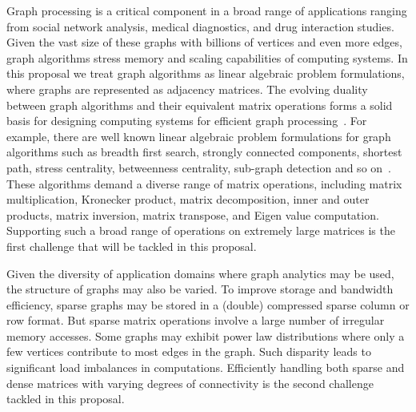 \noindent
Graph processing is a critical component in a broad range of applications ranging from social network analysis, medical diagnostics, and drug interaction studies.  
Given the vast size of these graphs with billions of vertices and even more edges, graph algorithms stress memory and scaling capabilities of computing systems. 
In this proposal we treat graph algorithms as linear algebraic problem formulations, where graphs are represented as adjacency matrices.  
The evolving duality between graph algorithms and their equivalent matrix operations forms a solid basis for 
designing computing systems %
for efficient graph processing~\cite{graph:primitives}.
For example, there are well known linear algebraic problem formulations for graph algorithms such as breadth first search, strongly connected components, shortest path, stress centrality, betweenness centrality, sub-graph detection and so on~\cite{kepner2011graph}.  
These algorithms demand a diverse range of matrix operations, including matrix multiplication, Kronecker product,  matrix decomposition, inner and outer products, matrix inversion, matrix transpose, and Eigen value computation.  
Supporting such a broad range of operations on extremely large matrices is the first challenge that will be tackled in this proposal. 


Given the diversity of application domains where graph analytics may be used, the structure of graphs may also be varied. 
To improve storage and bandwidth efficiency, sparse graphs may be stored in  a (double) compressed sparse column or row format. 
But sparse matrix operations involve a large number of irregular memory accesses.
Some graphs may exhibit power law distributions where only a few vertices contribute to most edges in the graph. 
Such disparity leads to significant load imbalances in computations.  
Efficiently handling both sparse and dense matrices with varying degrees of connectivity is the second challenge tackled in this proposal. 

